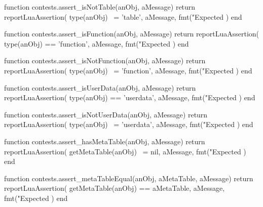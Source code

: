 \stopTestSuite


\startLuaCode
function contests.assert_isNotTable(anObj, aMessage)
  return reportLuaAssertion(
    type(anObj) ~= 'table',
    aMessage,
    fmt("Expected %
  )
end
\stopLuaCode

\stopTestSuite


\startLuaCode
function contests.assert_isFunction(anObj, aMessage)
  return reportLuaAssertion(
    type(anObj) == 'function',
    aMessage,
    fmt("Expected %
  )
end
\stopLuaCode

\stopTestSuite


\startLuaCode
function contests.assert_isNotFunction(anObj, aMessage)
  return reportLuaAssertion(
    type(anObj) ~= 'function',
    aMessage,
    fmt("Expected %
  )
end
\stopLuaCode

\stopTestSuite


\startLuaCode
function contests.assert_isUserData(anObj, aMessage)
  return reportLuaAssertion(
    type(anObj) == 'userdata',
    aMessage,
    fmt("Expected %
  )
end
\stopLuaCode

\stopTestSuite


\startLuaCode
function contests.assert_isNotUserData(anObj, aMessage)
  return reportLuaAssertion(
    type(anObj) ~= 'userdata',
    aMessage,
    fmt("Expected %
  )
end
\stopLuaCode

\stopTestSuite


\startLuaCode
function contests.assert_hasMetaTable(anObj, aMessage)
  return reportLuaAssertion(
    getMetaTable(anObj) ~= nil,
    aMessage,
    fmt("Expected %
  )
end
\stopLuaCode

\stopTestSuite


\startLuaCode
function contests.assert_metaTableEqual(anObj, aMetaTable, aMessage)
  return reportLuaAssertion(
    getMetaTable(anObj) == aMetaTable,
    aMessage,
    fmt("Expected %
  )
end
\stopLuaCode

